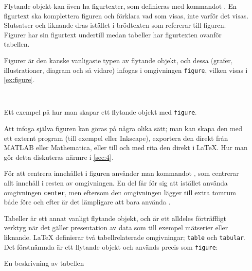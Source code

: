 \documentclass[lang=sv,ptsize=10pt,font=none,nomath,titles=bf,../../a4.tex]{subfiles}
\begin{document}
Flytande objekt kan även ha figurtexter, som definieras med kommandot
. En figurtext ska komplettera figuren och förklara vad som
visas, inte varför det visas. Slutsatser och liknande dras istället i
brödtexten som refererar till figuren. Figurer har sin figurtext undertill
medan tabeller har figurtexten ovanför tabellen.

Figurer är den kanske vanligaste typen av flytande objekt, och dessa
(grafer, illustrationer, diagram och så vidare) infogas i omgivningen
\texttt{figure}, vilken visas i \cref{ex:figure}.

\begin{kod}
	\centering\hspace{0.0075\textwidth}
	\begin{minipage}{0.75\textwidth} %
			\vfil{}\vfil
	\end{minipage}
	\\ \medskip
	\begin{minipage}{0.725\textwidth} %
	\end{minipage}
	\caption{Ett exempel på hur man skapar ett flytande objekt med
	\texttt{figure}.}
	\label{ex:figure}
\end{kod}

Att infoga själva figuren kan göras på några olika sätt; man kan skapa den
med ett externt program (till exempel  eller Inkscape), 
exportera den direkt från MATLAB eller Mathematica, eller till och med
rita den direkt i \LaTeX. Hur man gör detta diskuteras närmre i
\cref{sec:4}.

För att centrera innehållet i figuren använder man kommandot 
, som centrerar allt innehåll i resten av omgivningen. En
del får för sig att istället använda omgivningen \texttt{center}, men
eftersom den omgivningen lägger till extra tomrum både före och efter är
det lämpligare att bara använda .

\label{pack:booktabs}
Tabeller är ett annat vanligt flytande objekt, och är ett alldeles
förträffligt verktyg när det gäller presentation av data som till exempel
mätserier eller liknande. \LaTeX{} definierar två tabellrelaterade
omgivningar; \texttt{table} och \texttt{tabular}. Det förstnämnda är ett
flytande objekt och används precis som \texttt{figure}:
\begin{latexcode}
\begin{table}[tpb]
\centering 
\caption{En beskrivning av tabellen}
\end{table}
\end{latexcode}
\end{document}
